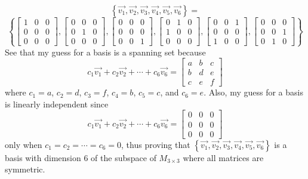 \documentclass[12pt]{article}
\begin{document}
\begin{itemize}
\begin{itemize}
\[\left\{ \vec{v_1}, \vec{v_2}, \vec{v_3},\vec{v_4}, \vec{v_5}, \vec{v_6} \right\} = \] \[\left\{
\left[\begin{array}{ccc} 1 & 0 & 0 \\ 0 & 0 & 0 \\ 0 & 0 & 0\end{array}\right], 
\left[\begin{array}{ccc} 0 & 0 & 0 \\ 0 & 1 & 0 \\ 0 & 0 & 0\end{array}\right],
\left[\begin{array}{ccc} 0 & 0 & 0 \\ 0 & 0 & 0 \\ 0 & 0 & 1\end{array}\right],
\left[\begin{array}{ccc} 0 & 1 & 0 \\ 1 & 0 & 0 \\ 0 & 0 & 0\end{array}\right], 
\left[\begin{array}{ccc} 0 & 0 & 1 \\ 0 & 0 & 0 \\ 1 & 0 & 0\end{array}\right],
\left[\begin{array}{ccc} 0 & 0 & 0 \\ 0 & 0 & 1 \\ 0 & 1 & 0\end{array}\right] \right\}\]
See that my guess for a basis is a spanning set because \[c_1\vec{v_1} + c_2\vec{v_2}+ \cdots + c_6\vec{v_6}=
\left[\begin{array}{ccc} a & b & c \\ b & d & e \\ c & e & f\end{array}\right]\] where $c_1=a$, $c_2=d$, $c_3=f$, $c_4=b$, $c_5=c$, and $c_6=e$. Also, my guess for a basis is linearly independent since
\[c_1\vec{v_1} + c_2\vec{v_2}+ \cdots + c_6\vec{v_6}=
\left[\begin{array}{ccc} 0 & 0 & 0 \\ 0 & 0 & 0 \\ 0 & 0 & 0\end{array}\right]\] only when $c_1=c_2=\cdots=c_6=0$, thus proving that $\left\{ \vec{v_1}, \vec{v_2}, \vec{v_3},\vec{v_4}, \vec{v_5}, \vec{v_6} \right\}$ is a basis with dimension 6 of the subspace of $M_{3\times 3}$ where all matrices are symmetric.
\end{itemize}


\end{itemize}
\end{document}
